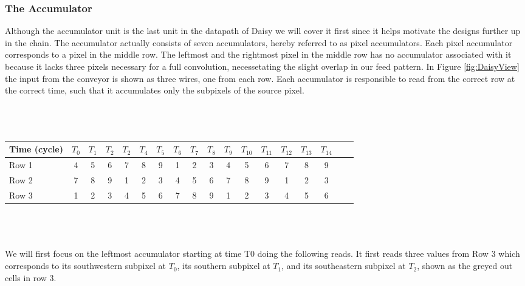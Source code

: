 \begin{Description}
\subsubsection{The Accumulator}
Although the accumulator unit is the last unit in the datapath of Daisy we will cover it first since it helps motivate the designs further up in the chain.
The accumulator actually consists of seven accumulators, hereby referred to as pixel accumulators. Each pixel accumulator corresponds to a pixel in the middle row.
The leftmost and the rightmost pixel in the middle row has no accumulator associated with it because it lacks three pixels necessary for a full convolution, necessetating the slight overlap in our feed pattern.
In Figure \ref{fig:DaisyView} the input from the conveyor is shown as three wires, one from each row.  
Each accumulator is responsible to read from the correct row at the correct time, such that it accumulates only the subpixels of the source pixel.\\ \\ \\
\\
\begin{tabular}{l*{16}{c}r}
    Time (cycle)        & $T_{0}$ & $T_{1}$ & $T_{2}$ & $T_{2}$ & $T_{4}$  & $T_{5}$ & $T_{6}$ & $T_{7}$ & $T_{8}$ & $T_{9}$ & $T_{10}$ & $T_{11}$ & $T_{12}$ & $T_{13}$ & $T_{14}$\\
\hline
Row 1                   & 4 & 5 & 6 & 7 & 8 & 9 & \cellcolor{gray75} 1 & \cellcolor{gray75} 2 & \cellcolor{gray75} 3 & 4 & 5 & 6 & 7 & 8 & 9 & \\
Row 2                   & 7 & 8 & 9 & \cellcolor{gray75} 1 & \cellcolor{gray75} 2 & \cellcolor{gray75} 3 & 4 & 5 & 6 & 7 & 8 & 9 & \cellcolor{gray75} 1 & \cellcolor{gray75} 2 & \cellcolor{gray75} 3 & \\
Row 3                   & \cellcolor{gray75} 1 & \cellcolor{gray75} 2 & \cellcolor{gray75} 3 & 4 & 5 & 6 & 7 & 8 & 9 & \cellcolor{gray75} 1 & \cellcolor{gray75} 2 & \cellcolor{gray75} 3 & 4 & 5 & 6 & \\
\end{tabular}\\ \\ \\
We will first focus on the leftmost accumulator starting at time T0 doing the following reads. 
It first reads three values from Row 3 which corresponds to its southwestern subpixel at $T_{0}$, its southern subpixel at $T_{1}$, and its southeastern subpixel at $T_{2}$, shown as the greyed out cells in row 3.

\end{Description}
